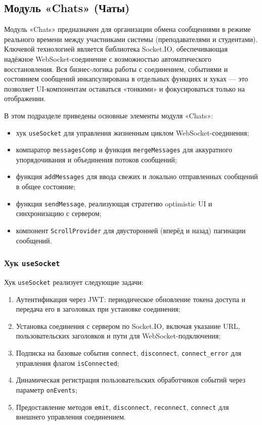 \subsection{Модуль «Chats» (Чаты)}
Модуль «Chats» предназначен для организации обмена сообщениями в режиме реального времени между участниками системы (преподавателями и студентами). Ключевой технологией является библиотека Socket.IO, обеспечивающая надёжное WebSocket-соединение с возможностью автоматического восстановления. Вся бизнес-логика работы с соединением, событиями и состоянием сообщений инкапсулирована в отдельных функциях и хуках — это позволяет UI-компонентам оставаться «тонкими» и фокусироваться только на отображении.

В этом подразделе приведены основные элементы модуля «Chats»:
\begin{itemize}
  \item хук \texttt{useSocket} для управления жизненным циклом WebSocket-соединения;
  \item компаратор \texttt{messagesComp} и функция \texttt{mergeMessages} для аккуратного упорядочивания и объединения потоков сообщений;
  \item функция \texttt{addMessages} для ввода свежих и локально отправленных сообщений в общее состояние;
  \item функция \texttt{sendMessage}, реализующая стратегию optimistic UI и синхронизацию с сервером;
  \item компонент \texttt{ScrollProvider} для двусторонней (вперёд и назад) пагинации сообщений.
\end{itemize}

\subsubsection{Хук \texttt{useSocket}}
Хук \texttt{useSocket} реализует следующие задачи:
\begin{enumerate}
  \item Аутентификация через JWT: периодическое обновление токена доступа и передача его в заголовках при установке соединения;
  \item Установка соединения с сервером по Socket.IO, включая указание URL, пользовательских заголовков и пути для WebSocket-подключения;
  \item Подписка на базовые события \texttt{connect}, \texttt{disconnect}, \texttt{connect\_error} для управления флагом \texttt{isConnected};
  \item Динамическая регистрация пользовательских обработчиков событий через параметр \texttt{onEvents};
  \item Предоставление методов \texttt{emit}, \texttt{disconnect}, \texttt{reconnect}, \texttt{connect} для внешнего управления соединением.
\end{enumerate}

